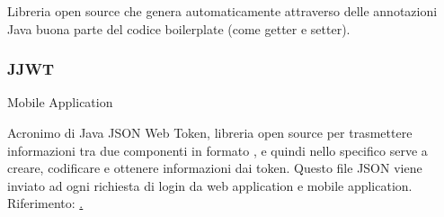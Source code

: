 \documentclass[../../../analisi-dei-requisiti.tex]{subfiles}
\begin{document}
Libreria open source che genera automaticamente attraverso delle annotazioni Java buona parte del codice boilerplate (come getter e setter).

\subsubsection{JJWT}%
\label{subs:jjwt}
Mobile Application

Acronimo di Java JSON Web Token, libreria open source per trasmettere informazioni tra due componenti in formato , e quindi nello specifico serve a creare, codificare e ottenere informazioni dai token. Questo file JSON viene inviato ad ogni richiesta di login da web application e mobile application.
Riferimento: \href{https://github.com/jwtk/jjwt}.
\end{document}
